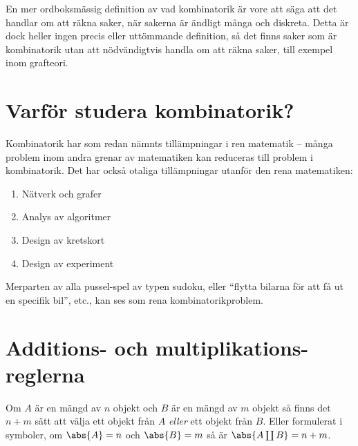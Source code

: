 \documentclass{tufte-handout}
\begin{document}
En mer ordboksmässig definition av vad kombinatorik är vore att säga att det handlar om att räkna saker, när sakerna är ändligt många och diskreta. Detta är dock heller ingen precis eller uttömmande definition, så det finns saker som är kombinatorik utan att nödvändigtvis handla om att räkna saker, till exempel inom grafteori.

\section{Varför studera kombinatorik?}

Kombinatorik har som redan nämnts tillämpningar i ren matematik -- många problem inom andra grenar av matematiken kan reduceras till problem i kombinatorik. Det har också otaliga tillämpningar utanför den rena matematiken:
\begin{enumerate}
	\item Nätverk och grafer
	\item Analys av algoritmer
	\item Design av kretskort
	\item Design av experiment
\end{enumerate}
Merparten av alla pussel-spel av typen sudoku, eller ``flytta bilarna för att få ut en specifik bil'', etc., kan ses som rena kombinatorikproblem.

\section{Additions- och multiplikations-reglerna}

\begin{definition}
	Om $A$ är en mängd av $n$ objekt och $B$ är en mängd av $m$ objekt så finns det $n+m$ sätt att välja ett objekt från $A$ \emph{eller} ett objekt från $B$. Eller formulerat i symboler, om $\abs{A} = n$ och $\abs{B} = m$ så är $\abs{A \coprod B} = n + m$.
\end{definition}
\end{document}
